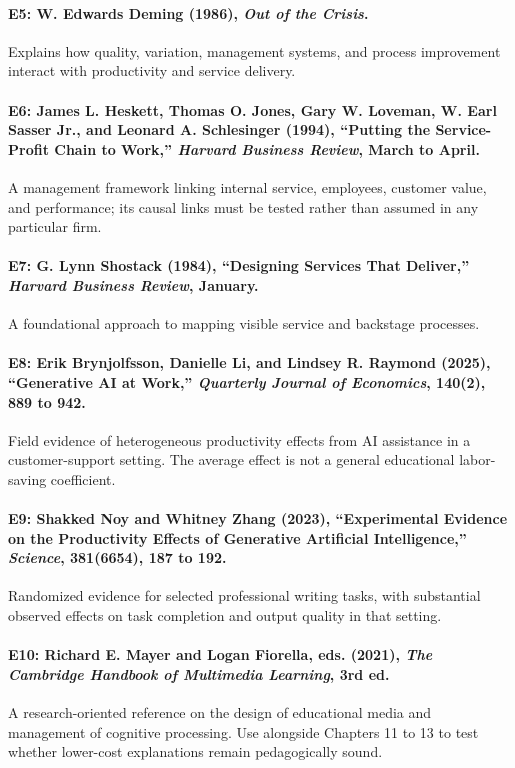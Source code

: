 \paragraph*{E5: W. Edwards Deming (1986), \emph{Out of the Crisis}.} Explains how quality, variation, management systems, and process improvement interact with productivity and service delivery.

\paragraph*{E6: James L. Heskett, Thomas O. Jones, Gary W. Loveman, W. Earl Sasser Jr., and Leonard A. Schlesinger (1994), ``Putting the Service-Profit Chain to Work,'' \emph{Harvard Business Review}, March to April.} A management framework linking internal service, employees, customer value, and performance; its causal links must be tested rather than assumed in any particular firm.

\paragraph*{E7: G. Lynn Shostack (1984), ``Designing Services That Deliver,'' \emph{Harvard Business Review}, January.} A foundational approach to mapping visible service and backstage processes.

\paragraph*{E8: Erik Brynjolfsson, Danielle Li, and Lindsey R. Raymond (2025), ``Generative AI at Work,'' \emph{Quarterly Journal of Economics}, 140(2), 889 to 942.} Field evidence of heterogeneous productivity effects from AI assistance in a customer-support setting. The average effect is not a general educational labor-saving coefficient.

\paragraph*{E9: Shakked Noy and Whitney Zhang (2023), ``Experimental Evidence on the Productivity Effects of Generative Artificial Intelligence,'' \emph{Science}, 381(6654), 187 to 192.} Randomized evidence for selected professional writing tasks, with substantial observed effects on task completion and output quality in that setting.

\paragraph*{E10: Richard E. Mayer and Logan Fiorella, eds. (2021), \emph{The Cambridge Handbook of Multimedia Learning}, 3rd ed.} A research-oriented reference on the design of educational media and management of cognitive processing. Use alongside Chapters 11 to 13 to test whether lower-cost explanations remain pedagogically sound.

